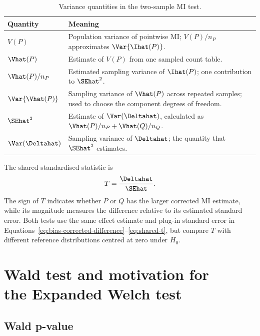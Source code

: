 \begin{table}[H]
\centering
\caption{Variance quantities in the two-sample MI test.}
\label{tab:results-variance-quantities}
\thesistableformat
\begin{tabularx}{\textwidth}{@{}l>{\raggedright\arraybackslash}X@{}}
\toprule
\textbf{Quantity} & \textbf{Meaning}\\
\midrule
\(V(P)\) & Population variance of pointwise MI; \(V(P)/n_P\)
approximates \(\Var\{\Ihat(P)\}\).\\
\addlinespace
\(\Vhat(P)\) & Estimate of \(V(P)\) from one sampled count table.\\
\addlinespace
\(\Vhat(P)/n_P\) & Estimated sampling variance of \(\Ihat(P)\);
one contribution to \(\SEhat^2\).\\
\addlinespace
\(\Var\{\Vhat(P)\}\) & Sampling variance of \(\Vhat(P)\) across repeated samples;
used to choose the component degrees of freedom.\\
\addlinespace
\(\SEhat^2\) & Estimate of \(\Var(\Deltahat)\), calculated as
\(\Vhat(P)/n_P+\Vhat(Q)/n_Q\).\\
\addlinespace
\(\Var(\Deltahat)\) & Sampling variance of \(\Deltahat\); the quantity
that \(\SEhat^2\) estimates.\\
\bottomrule
\end{tabularx}
\end{table}

The shared standardised statistic is
\begin{equation}
  T=\frac{\Deltahat}{\SEhat}.
  \label{eq:shared-t}
\end{equation}
The sign of \(T\) indicates whether \(P\) or \(Q\) has the larger
corrected MI estimate, while its magnitude measures the difference relative
to its estimated standard error. Both tests use the same effect estimate
and plug-in standard error in
Equations~\eqref{eq:bias-corrected-difference}--\eqref{eq:shared-t}, but
compare \(T\) with different reference distributions centred at zero
under \(H_0\).

\section[Wald test and motivation for the Expanded Welch test]{Wald test and motivation for\\the Expanded Welch test}

\subsection{Wald p-value}

